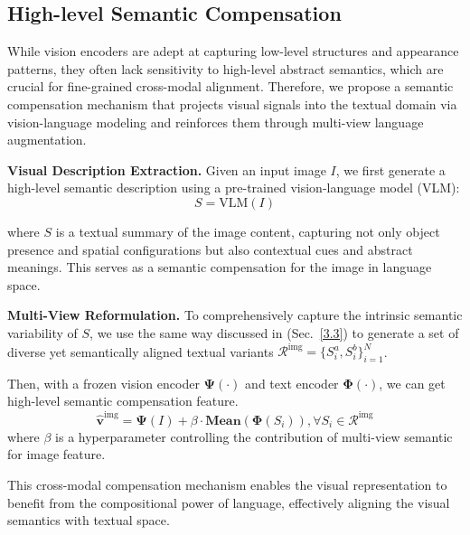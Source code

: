 \subsection{High-level Semantic Compensation}
While vision encoders are adept at capturing low-level structures and appearance patterns, they often lack sensitivity to high-level abstract semantics, which are crucial for fine-grained cross-modal alignment. Therefore, we propose a semantic compensation mechanism that projects visual signals into the textual domain via vision-language modeling and reinforces them through multi-view language augmentation.

\noindent\textbf{Visual Description Extraction.}
Given an input image \( I \), we first generate a high-level semantic description using a pre-trained vision-language model (VLM):
\begin{equation}
    S = \text{VLM}(I)
\end{equation}

where \( S \) is a textual summary of the image content, capturing not only object presence and spatial configurations but also contextual cues and abstract meanings. This serves as a semantic compensation for the image in language space.

\noindent\textbf{Multi-View Reformulation.}
To comprehensively capture the intrinsic semantic variability of \( S \), we use the same way discussed in (Sec.~\ref{3.3}) to generate a set of diverse yet semantically aligned textual variants \(\mathcal{R}^{\text{img}} = \{S^{a}_{i}, S^{b}_{i}\}_{i=1}^{N}\).

Then, with a frozen vision encoder \( \boldsymbol{\Psi}(\cdot) \) and text encoder \( \boldsymbol{\Phi}(\cdot) \), we can get high-level semantic compensation feature.
\begin{equation}
    \hat{\mathbf{v}}^{\text{img}} = \mathbf{\Psi}(I) + \beta \cdot \textbf{Mean}(\mathbf{\Phi}(S_i)), \forall S_i \in \mathcal{R}^{\text{img}}
\label{eq:beta}
\end{equation}
where $\beta$ is a hyperparameter controlling the contribution of multi-view semantic for image feature.


This cross-modal compensation mechanism enables the visual representation to benefit from the compositional power of language, effectively aligning the visual semantics with textual space.



